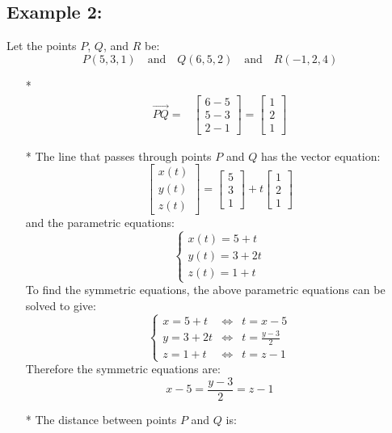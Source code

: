 \documentclass{article}
\begin{document}
\subsection*{Example 2:}

Let the points \(P\), \(Q\), and \(R\) be:
\[P(5, 3, 1) \quad\text{and}\quad Q(6, 5, 2) \quad\text{and}\quad R(-1, 2, 4)\]
\begin{itemize}
\item[*] \begin{align*}
\overrightarrow{PQ} = & \begin{bmatrix} 6 - 5 \\ 5 - 3 \\ 2 - 1 \end{bmatrix} = \begin{bmatrix} 1 \\ 2 \\ 1 \end{bmatrix}
\end{align*}
\item[*] The line that passes through points \(P\) and \(Q\) has the vector equation:
\[\begin{bmatrix} x(t) \\ y(t) \\ z(t) \end{bmatrix} = \begin{bmatrix} 5 \\ 3 \\ 1 \end{bmatrix} + t\begin{bmatrix} 1 \\ 2 \\ 1 \end{bmatrix}\] 
and the parametric equations:
\[\left\{\begin{array}{c} 
x(t) = 5 + t \\ 
y(t) = 3 + 2t \\ 
z(t) = 1 + t 
\end{array}\right.\]
To find the symmetric equations, the above parametric equations can be solved to give:
 \[\left\{\begin{array}{ccc} 
x = 5 + t & \iff & t = x - 5 \\ 
y = 3 + 2t & \iff & t = \frac{y - 3}{2} \\ 
z = 1 + t & \iff & t = z - 1  
\end{array}\right.\]
Therefore the symmetric equations are:
\[x - 5 = \frac{y - 3}{2} = z - 1\] 
\item[*] The distance between points \(P\) and \(Q\) is: 

\end{itemize}
\end{document}
